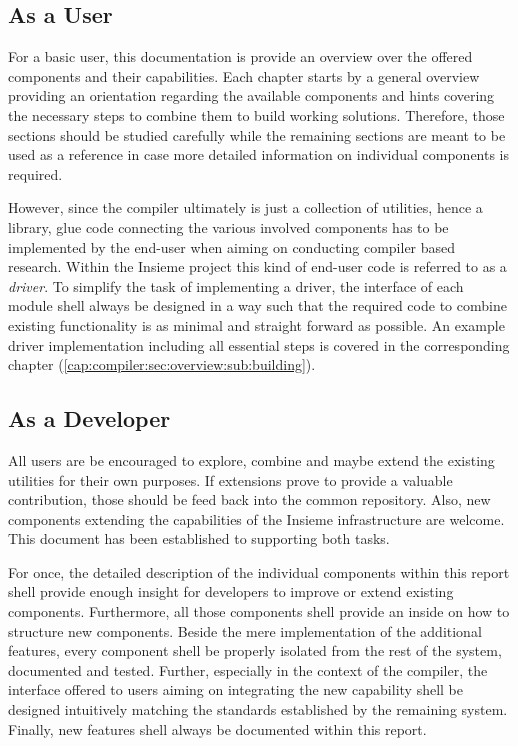 \subsection{As a User}
For a basic user, this documentation is provide an overview over the
offered components and their capabilities. Each chapter starts by a general
overview providing an orientation regarding the available components and
hints covering the necessary steps to combine them to build working solutions.
Therefore, those sections should be studied carefully while the remaining
sections are meant to be used as a reference in case more detailed information
on individual components is required.

However, since the compiler ultimately is just a collection of utilities, hence
a library, glue code connecting the various involved components has to be
implemented by the end-user when aiming on conducting compiler based research.
Within the Insieme project this kind of end-user code is referred to as a
\textit{driver}. To simplify the task of implementing a driver, the interface of
each module shell always be designed in a way such that the required code to
combine existing functionality is as minimal and straight forward as possible.
An example driver implementation including all essential steps is covered in
the corresponding chapter (\ref{cap:compiler:sec:overview:sub:building}).


\subsection{As a Developer}
All users are be encouraged to explore, combine and maybe extend the existing
utilities for their own purposes. If extensions prove to provide a valuable
contribution, those should be feed back into the common repository. Also, new
components extending the capabilities of the Insieme infrastructure are welcome.
This document has been established to supporting both tasks.

For once, the detailed description of the individual components within this
report shell provide enough insight for developers to improve or extend existing
components. Furthermore, all those components shell provide an inside on how to
structure new components. Beside the mere implementation of the additional
features, every component shell be properly isolated from the rest of the
system, documented and tested. Further, especially in the context of the
compiler, the interface offered to users aiming on integrating the new
capability shell be designed intuitively matching the standards established by
the remaining system. Finally, new features shell always be documented within
this report.
